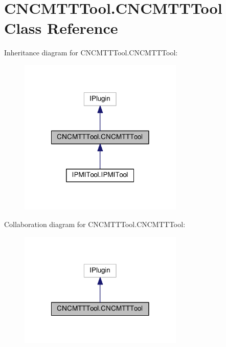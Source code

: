 \hypertarget{class_c_n_c_m_t_t_tool_1_1_c_n_c_m_t_t_tool}{\section{C\-N\-C\-M\-T\-T\-Tool.\-C\-N\-C\-M\-T\-T\-Tool Class Reference}
\label{class_c_n_c_m_t_t_tool_1_1_c_n_c_m_t_t_tool}
}


Inheritance diagram for C\-N\-C\-M\-T\-T\-Tool.\-C\-N\-C\-M\-T\-T\-Tool\-:
\nopagebreak
\begin{figure}[H]
\begin{center}
\leavevmode
\includegraphics[width=222pt]{class_c_n_c_m_t_t_tool_1_1_c_n_c_m_t_t_tool__inherit__graph}
\end{center}
\end{figure}


Collaboration diagram for C\-N\-C\-M\-T\-T\-Tool.\-C\-N\-C\-M\-T\-T\-Tool\-:
\nopagebreak
\begin{figure}[H]
\begin{center}
\leavevmode
\includegraphics[width=222pt]{class_c_n_c_m_t_t_tool_1_1_c_n_c_m_t_t_tool__coll__graph}
\end{center}
\end{figure}

